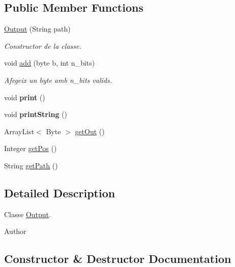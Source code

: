 \subsection*{Public Member Functions}
\begin{DoxyCompactItemize}
\item 
\hyperlink{classpersistencia_1_1output_1_1Output_acbb70ea9eabb2a6d0b2d7bd2f3c9009a}{Output} (String path)
\begin{DoxyCompactList}\small\item\em Constructor de la classe. \end{DoxyCompactList}\item 
void \hyperlink{classpersistencia_1_1output_1_1Output_adc03a0dd7a94da21fe8432064a4eec09}{add} (byte b, int n\+\_\+bits)
\begin{DoxyCompactList}\small\item\em Afegeix un byte amb n\+\_\+bits valids. \end{DoxyCompactList}\item 
\mbox{\label{classpersistencia_1_1output_1_1Output_a416850e57f55bd371d60b2aae8e7e983}} 
void {\bfseries print} ()
\item 
\mbox{\label{classpersistencia_1_1output_1_1Output_ae6398e0602d281fd044d6557a16eb727}} 
void {\bfseries print\+String} ()
\item 
Array\+List$<$ Byte $>$ \hyperlink{classpersistencia_1_1output_1_1Output_ae4f870c86bed5b445125df989b313b9f}{get\+Out} ()
\item 
Integer \hyperlink{classpersistencia_1_1output_1_1Output_a01f862217e01efb59bc2eff3fe54006f}{get\+Pos} ()
\item 
String \hyperlink{classpersistencia_1_1output_1_1Output_ae33fc52334f791b6d4d7aebf2931df8d}{get\+Path} ()
\end{DoxyCompactItemize}


\subsection{Detailed Description}
Classe \hyperlink{classpersistencia_1_1output_1_1Output}{Output}. 

\begin{DoxyAuthor}{Author}

\end{DoxyAuthor}


\subsection{Constructor \& Destructor Documentation}
\mbox{\label{classpersistencia_1_1output_1_1Output_acbb70ea9eabb2a6d0b2d7bd2f3c9009a}} 
